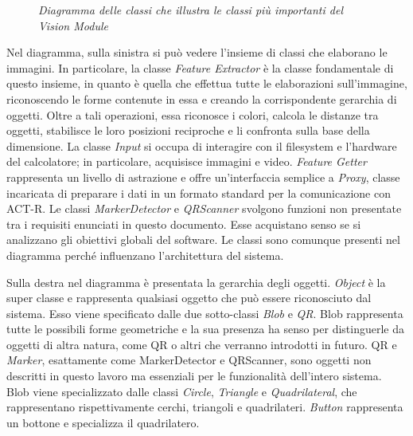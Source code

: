 		\begin{figure}[h]
		  \begin{center} 
		  \end{center} 
		  \caption{\textit{Diagramma delle classi che illustra le classi più importanti del Vision Module}}  
		  \label{fig:classOverviewITA}
	 	\end{figure}	
		
		Nel diagramma, sulla sinistra si può vedere l'insieme di classi che elaborano le immagini.
		In particolare, la classe \emph{Feature Extractor} è la classe fondamentale di questo insieme, in quanto è quella che effettua tutte le elaborazioni sull'immagine, riconoscendo le forme contenute in essa e creando la corrispondente gerarchia di oggetti. 
		Oltre a tali operazioni, essa riconosce i colori, calcola le distanze tra oggetti, stabilisce le loro posizioni reciproche e li confronta sulla base della dimensione.
		La classe \emph{Input} si occupa di interagire con il filesystem e l'hardware del calcolatore; in particolare, acquisisce immagini e video.
		\emph{Feature Getter} rappresenta un livello di astrazione e offre un'interfaccia semplice a \emph{Proxy}, classe incaricata di preparare i dati in un formato standard per la comunicazione con \mbox{ACT-R}.
		Le classi \emph{MarkerDetector} e \emph{QRScanner} svolgono funzioni non presentate tra i requisiti enunciati in questo documento. Esse acquistano senso se si analizzano gli obiettivi globali del software.
		Le classi sono comunque presenti nel diagramma perché influenzano l'architettura del sistema.

		Sulla destra nel diagramma è presentata la gerarchia degli oggetti.
		\emph{Object} è la super classe e rappresenta qualsiasi oggetto che può essere riconosciuto dal sistema.
		Esso viene specificato dalle due sotto-classi \emph{Blob} e \emph{QR}.
		Blob rappresenta tutte le possibili forme geometriche e la sua presenza ha senso per distinguerle da oggetti di altra natura, come QR o altri che verranno introdotti in futuro.
		QR e \emph{Marker}, esattamente come MarkerDetector e QRScanner, sono oggetti non descritti in questo lavoro ma essenziali per le funzionalità dell'intero sistema.
		Blob viene specializzato dalle classi \emph{Circle}, \emph{Triangle} e \emph{Quadrilateral}, che rappresentano rispettivamente cerchi, triangoli e quadrilateri.
		\emph{Button} rappresenta un bottone e specializza il quadrilatero.



